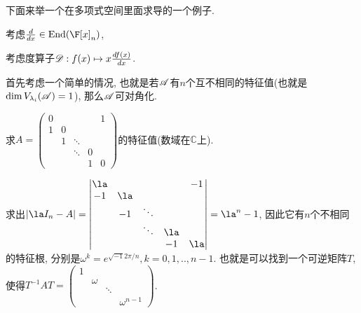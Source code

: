 下面来举一个在多项式空间里面求导的一个例子. 
\begin{example}
考虑$\frac{d}{dx}\in\End(\F[x]_{n})$, 
\end{example}
%
\begin{example}
考虑度算子$\mathscr{D}:f(x)\mapsto x\frac{df(x)}{dx}$. 
\end{example}
首先考虑一个简单的情况, 也就是若$\mathscr{A}$有$n$个互不相同的特征值(也就是$\dim V_{\lambda_{i}}(\mathscr{A})=1$),
那么$\mathscr{A}$可对角化. 
\begin{example}
\label{prob:matrix-eigen-self-represent}求$A=\begin{pmatrix}0 &  &  &  & 1\\
1 & 0\\
 & 1 & \ddots\\
 &  & \ddots & 0\\
 &  &  & 1 & 0
\end{pmatrix}$的特征值(数域在$\mathbb{C}$上).
\end{example}
\begin{sol*}
求出$|\la I_{n}-A|=\begin{vmatrix}\la &  &  &  & -1\\
-1 & \la\\
 & -1 & \ddots\\
 &  & \ddots & \la\\
 &  &  & -1 & \la
\end{vmatrix}=\la^{n}-1$, 因此它有$n$个不相同的特征根, 分别是$\omega^{k}=e^{\sqrt{-1}2\pi/n},k=0,1,..,n-1$.
也就是可以找到一个可逆矩阵$T$, 使得$T^{-1}AT=\begin{pmatrix}1\\
 & \omega\\
 &  & \ddots\\
 &  &  & \omega^{n-1}
\end{pmatrix}$. 
\end{sol*}
\noindent{}

